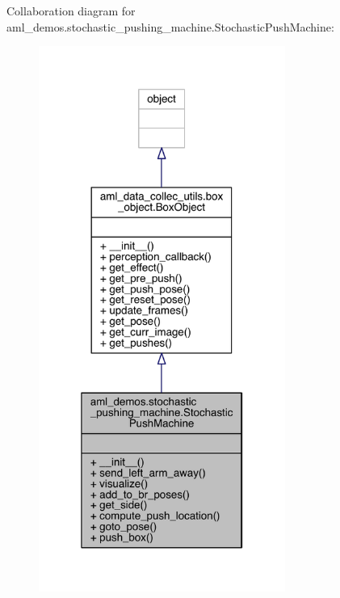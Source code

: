 Collaboration diagram for aml\+\_\+demos.\+stochastic\+\_\+pushing\+\_\+machine.\+Stochastic\+Push\+Machine\+:
\nopagebreak
\begin{figure}[H]
\begin{center}
\leavevmode
\includegraphics[width=229pt]{classaml__demos_1_1stochastic__pushing__machine_1_1_stochastic_push_machine__coll__graph}
\end{center}
\end{figure}
